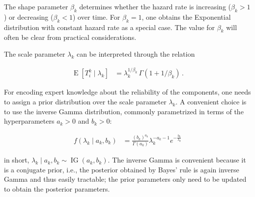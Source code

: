 \documentclass[Journal,SectionNumbers,InsideFigs]{ascelike}
\newcommand{\E}{\operatorname{E}}
\newcommand{\ig}{\operatorname{IG}}   %
\begin{document}
The shape parameter $\beta_k$ determines whether the hazard rate is increasing ($\beta_k > 1$)
or decreasing ($\beta_k < 1$) over time.
For $\beta_k=1$, one obtains the Exponential distribution with constant hazard rate as a special case.
The value for $\beta_k$ will often be clear from practical considerations.

The scale parameter $\lambda_k$ can be interpreted through the relation
\begin{linenomath*}
\begin{align}
\E[T_i^k \mid \lambda_k] &= \lambda_k^{1/\beta_k}\, \Gamma(1 + 1/\beta_k)\,.
\label{eq:lambdainterpret}
\end{align}
\end{linenomath*}
For encoding expert knowledge about the reliability of the components,
one needs to assign a prior distribution over the scale parameter $\lambda_k$.
A convenient choice is to use the inverse Gamma distribution,
commonly parametrized in terms of the hyperparameters $a_k > 0$ and $b_k > 0$:
\begin{linenomath*}
\begin{align}
f(\lambda_k\mid a_k,b_k) &= \frac{(b_k)^{a_k}}{\Gamma(a_k)} \lambda_k^{-a_k -1} e^{-\frac{b_k}{\lambda_k}}
\label{eq:ig-def}
\end{align}
\end{linenomath*}
in short, $\lambda_k \mid a_k, b_k \sim \ig(a_k,b_k)$.
The inverse Gamma is convenient because it is a conjugate prior,
i.e., the posterior obtained by Bayes' rule is again inverse Gamma and thus easily tractable;
the prior parameters only need to be updated to obtain the posterior parameters.
\end{document}
